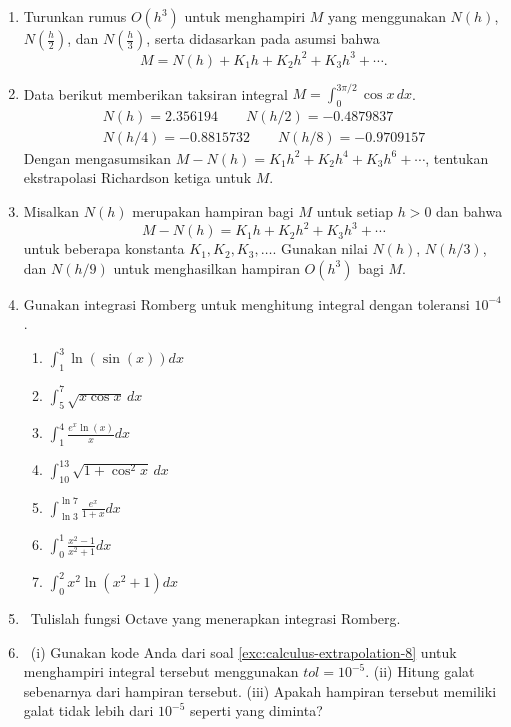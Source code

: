 \begin{enumerate}
\begin{enumerate}
\item Gunakan ekstrapolasi Richardson untuk menurunkan rumus $O(h^{2})$
bagi $f'(x_{0})$.
\item Rumus yang Anda turunkan seharusnya tampak familier. Rumus apakah
yang mirip dengannya? Apakah keduanya benar-benar sama? Mengapa atau
mengapa tidak?
\end{enumerate}
\item \label{exc:calculus-extrapolation-5}Turunkan rumus $O(h^{3})$ untuk
menghampiri $M$ yang menggunakan $N(h)$, $N(\frac{h}{2})$, dan
$N(\frac{h}{3})$, serta didasarkan pada asumsi bahwa \hasasolution 
\[
M=N(h)+K_{1}h+K_{2}h^{2}+K_{3}h^{3}+\cdots.
\]
\item \label{exc:calculus-extrapolation-6}Data berikut memberikan taksiran
integral $M=\int_{0}^{3\pi/2}\cos x\,dx$.
\[
\begin{gathered}N(h)=2.356194\qquad N(h/2)=-0.4879837\\
N(h/4)=-0.8815732\qquad N(h/8)=-0.9709157
\end{gathered}
\]
Dengan mengasumsikan $M-N(h)=K_{1}h^{2}+K_{2}h^{4}+K_{3}h^{6}+\cdots$,
tentukan ekstrapolasi Richardson ketiga untuk $M$. \hasasolution 
\item \label{exc:calculus-extrapolation-7}Misalkan $N(h)$ merupakan hampiran
bagi $M$ untuk setiap $h>0$ dan bahwa 
\[
M-N(h)=K_{1}h+K_{2}h^{2}+K_{3}h^{3}+\cdots
\]
untuk beberapa konstanta $K_{1},K_{2},K_{3},\ldots$. Gunakan nilai
$N(h)$, $N(h/3)$, dan $N(h/9)$ untuk menghasilkan hampiran $O(h^{3})$
bagi $M$. \hasananswer 
\item \label{exc:calculus-extrapolation-11}Gunakan integrasi Romberg untuk
menghitung integral dengan toleransi $10^{-4}$.

\begin{enumerate}
\item ${\displaystyle \int_{1}^{3}\ln(\sin(x))dx}$ \hasasolution 
\item ${\displaystyle \int_{5}^{7}\sqrt{x\cos x}\,dx}$
\item ${\displaystyle \int_{1}^{4}\frac{e^{x}\ln(x)}{x}dx}$ \hasananswer 
\item ${\displaystyle \int_{10}^{13}\sqrt{1+\cos^{2}x}\,dx}$
\item ${\displaystyle \int_{\ln3}^{\ln7}\frac{e^{x}}{1+x}dx}$ \hasananswer 
\item ${\displaystyle \int_{0}^{1}\frac{x^{2}-1}{x^{2}+1}dx}$
\item ${\displaystyle \int_{0}^{2}x^{2}\ln(x^{2}+1)dx}$ \hasananswer 
\end{enumerate}
\item \label{exc:calculus-extrapolation-8}\octave\ Tulislah fungsi Octave
yang menerapkan integrasi Romberg. \hasananswer 
\item \label{exc:calculus-extrapolation-10}\octave\ (i) Gunakan kode Anda
dari soal \ref{exc:calculus-extrapolation-8} untuk menghampiri integral
tersebut menggunakan $tol=10^{-5}$. (ii) Hitung galat sebenarnya
dari hampiran tersebut. (iii) Apakah hampiran tersebut memiliki galat
tidak lebih dari $10^{-5}$ seperti yang diminta?


\end{enumerate}
